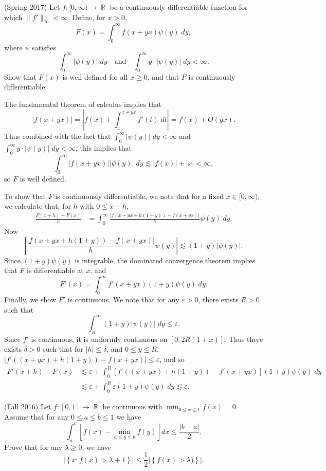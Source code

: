 \documentclass[answers]{exam}
\DeclareMathOperator{\RR}{\mathbb{R}}
\begin{document}
\begin{questions}
    
\question (Spring 2017)
    Let $f: [0,\infty) \to \RR$ be a continuously differentiable function for which $\| f' \|_\infty < \infty$. Define, for $x > 0$,
    \[ F(x) = \int_0^\infty f(x + yx) \psi(y)\; dy, \]
    where $\psi$ satisfies
    \[ \int_0^\infty |\psi(y)|\; dy \quad\text{and}\quad \int_0^\infty y \cdot |\psi(y)|\; dy < \infty. \]
    Show that $F(x)$ is well defined for all $x \geq 0$, and that $F$ is continuously differentiable.
\begin{solution}
    The fundamental theorem of calculus implies that
    \[ |f(x + yx)| = \left| f(x) + \int_x^{x+yx} f'(t)\; dt \right| = f(x) + O(yx). \]
    Thus combined with the fact that $\int_0^\infty |\psi(y)|\; dy < \infty$ and $\int_0^\infty y \cdot |\psi(y)|\; dy < \infty$, this implies that
    \[ \int_0^\infty |f(x + yx)| |\psi(y)|\; dy \lesssim |f(x)| + |x| < \infty, \]
    so $F$ is well defined.
    
    To show that $F$ is continuously differentiable, we note that for a fixed $x \in [0,\infty)$, we calculate that, for $h$ with $0 \leq x + h$,
    \begin{align*}
        \frac{F(x+h) - F(x)}{h} &= \int_0^\infty \frac{|f(x+yx + h(1 + y)) - f(x + yx)|}{h} \psi(y)\; dy.
    \end{align*}
    Now
    \[ \left| \frac{|f(x+yx + h(1 + y)) - f(x + yx)|}{h} \psi(y) \right| \lesssim (1 + y) |\psi(y)|. \]
    Since $(1 + y) \psi(y)$ is integrable, the dominated convergence theorem implies that $F$ is differentiable at $x$, and
    \[ F'(x) = \int_0^\infty f'(x + yx) (1 + y) \psi(y)\; dy. \]
    Finally, we show $F'$ is continuous. We note that for any $\varepsilon > 0$, there exists $R > 0$ such that
    \[ \int_R^\infty (1 + y) |\psi(y)|\; dy \leq \varepsilon. \]
    Since $f'$ is continuous, it is uniformly continuous on $[0,2R(1 + x)]$. Thus there exists $\delta > 0$ such that for $|h| \leq \delta$, and $0 \leq y \leq R$, $|f'((x + yx) + h(1 + y)) - f(x + yx)| \leq \varepsilon$, and so
    \begin{align*}
        F'(x+h) - F(x) &\lesssim \varepsilon + \int_0^R [f'((x + yx) + h(1 + y)) - f'(x + yx)] (1 + y) \psi(y)\; dy\\
        &\lesssim \varepsilon + \int_0^R \varepsilon (1 + y) \psi(y)\; dy \lesssim \varepsilon.
    \end{align*}
\end{solution}

\question (Fall 2016) Let $f:[0,1]\to \RR$ be continuous with $\min_{0\leq x\leq 1} f(x) = 0$. Assume that for any $0\leq a\leq b\leq 1$ we have
%
\[ \int_{a}^{b}[f(x)-\min_{a\leq y\leq b}f(y)]dx \leq \frac{|b-a|}{2}. \]
%
Prove that for any $\lambda\geq 0$, we have
\begin{equation*}
\left| \left\{ x:f(x)>\lambda+1 \right\} \right|\leq \frac{1}{2} \left| \left\{ f(x)>\lambda) \right\} \right|.
\end{equation*}


\end{questions}
\end{document}
